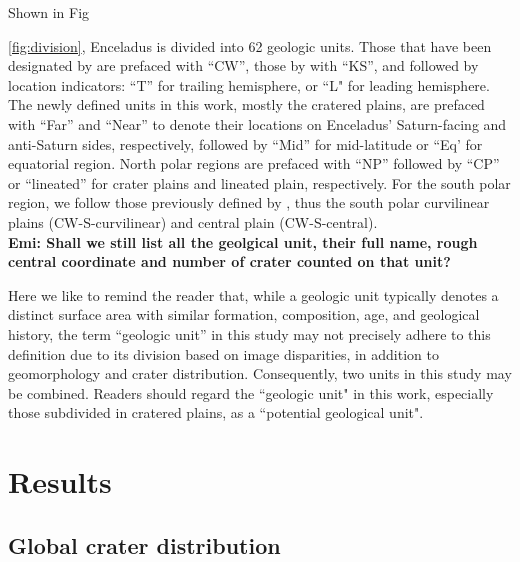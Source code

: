 \documentclass[preprint,11pt,3p,times,authoryear]{elsarticle}
\begin{document}
Shown in Fig~{\ref{fig:division}, Enceladus is divided into 62 geologic units. Those that have been designated by \citet{CrowWillard2015} are prefaced with ``CW'', those by \citet{Kirchoff2009} with ``KS'', and followed by location indicators: ``T'' for trailing hemisphere, or ``L" for leading hemisphere. The newly defined units in this work, mostly the cratered plains, are prefaced with ``Far'' and ``Near'' to denote their locations on Enceladus' Saturn-facing and anti-Saturn sides, respectively, followed by ``Mid'' for mid-latitude or ``Eq’ for equatorial region. North polar regions are prefaced with ``NP'' followed by ``CP'' or ``lineated'' for crater plains and lineated plain, respectively. For the south polar region, we follow those previously defined by \citet{CrowWillard2015}, thus the south polar curvilinear plains (CW-S-curvilinear) and central plain (CW-S-central). \\
\textbf{Emi: Shall we still list all the geolgical unit, their full name, rough central coordinate and number of crater counted on that unit?}

Here we like to remind the reader that, while a geologic unit typically denotes a distinct surface area with similar formation, composition, age, and geological history, the term ``geologic unit'' in this study may not precisely adhere to this definition due to its division based on image disparities, in addition to geomorphology and crater distribution. Consequently, two units in this study may be combined. Readers should regard the ``geologic unit" in this work, especially those subdivided in cratered plains, as a ``potential geological unit".


\section{Results}

\subsection{Global crater distribution}
\label{subsec:crater_dist}

}
\end{document}

